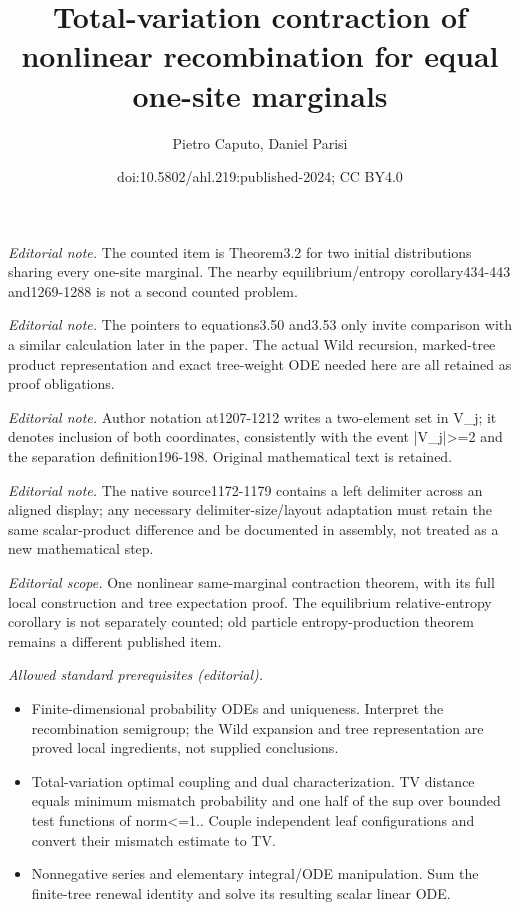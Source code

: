 \documentclass[10pt,a4paper]{article}
\title{Total-variation contraction of nonlinear recombination for equal one-site marginals}
\author{Pietro Caputo, Daniel Parisi}
\date{doi:10.5802/ahl.219:published-2024; CC BY4.0}
\begin{document}
\maketitle
\noindent\textit{Editorial note.} The counted item is Theorem3.2 for two initial distributions sharing every one-site marginal. The nearby equilibrium/entropy corollary434-443 and1269-1288 is not a second counted problem.\par\medskip
\noindent\textit{Editorial note.} The pointers to equations3.50 and3.53 only invite comparison with a similar calculation later in the paper. The actual Wild recursion, marked-tree product representation and exact tree-weight ODE needed here are all retained as proof obligations.\par\medskip
\noindent\textit{Editorial note.} Author notation at1207-1212 writes a two-element set in V\_j; it denotes inclusion of both coordinates, consistently with the event |V\_j|>=2 and the separation definition196-198. Original mathematical text is retained.\par\medskip
\noindent\textit{Editorial note.} The native source1172-1179 contains a left delimiter across an aligned display; any necessary delimiter-size/layout adaptation must retain the same scalar-product difference and be documented in assembly, not treated as a new mathematical step.\par\medskip
\noindent\textit{Editorial scope.} One nonlinear same-marginal contraction theorem, with its full local construction and tree expectation proof. The equilibrium relative-entropy corollary is not separately counted; old particle entropy-production theorem remains a different published item.\par\medskip
\noindent\textit{Allowed standard prerequisites (editorial).}\begin{itemize}
\item Finite-dimensional probability ODEs and uniqueness. Interpret the recombination semigroup; the Wild expansion and tree representation are proved local ingredients, not supplied conclusions.
\item Total-variation optimal coupling and dual characterization. TV distance equals minimum mismatch probability and one half of the sup over bounded test functions of norm<=1.. Couple independent leaf configurations and convert their mismatch estimate to TV.
\item Nonnegative series and elementary integral/ODE manipulation. Sum the finite-tree renewal identity and solve its resulting scalar linear ODE.
\end{itemize}\medskip
\end{document}
